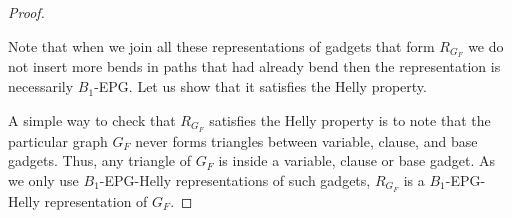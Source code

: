 \documentclass[preprint,12pt]{elsarticle} %
\begin{document}
\begin{proof}
\begin{landscape}

\end{landscape}

%





% 

% 

Note that when we join all these representations of gadgets that form $ R_{G_F} $ we do not insert more bends in paths that had already bend then the representation is necessarily  $ B_1$-EPG. Let us show that it satisfies the Helly property. 

A simple way to check that $ R_{G_F} $ satisfies the Helly property  is to note that the particular graph $G_F$ never forms triangles between variable, clause, and base gadgets. Thus, any triangle of $G_F$ is inside a variable, clause or base gadget. As we only use $B_1$-EPG-Helly representations of such gadgets, $ R_{G_F} $ is a $B_1$-EPG-Helly representation of $G_F$.



\end{proof}
\end{document}
